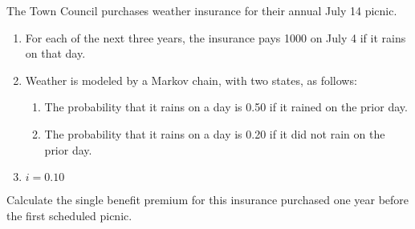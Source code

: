 The Town Council purchases weather insurance for their annual July 14 picnic.
\begin{enumerate}
\item For each of the next three years, the insurance pays 1000 on July 4 if it rains on that day.
\item Weather is modeled by a Markov chain, with two states, as follows:
   \begin{enumerate}
        \item The probability that it rains on a day is 0.50 if it rained on the prior day.
        \item The probability that it rains on a day is 0.20 if it did not rain on the prior day.
    \end{enumerate}
\item $ i = 0.10$
\end{enumerate}
Calculate the single benefit premium for this insurance purchased one year before the
first scheduled picnic.

